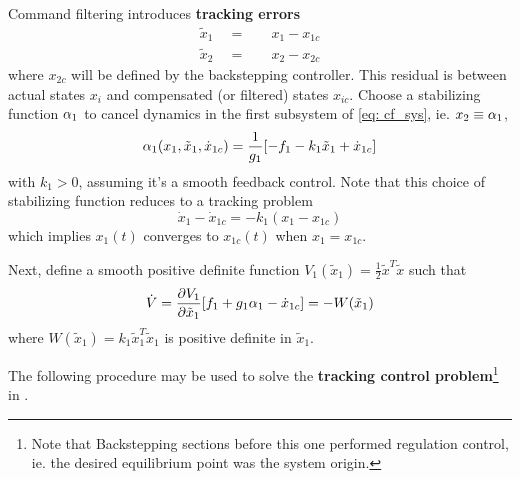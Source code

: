 \documentclass[12pt]{ucthesis}
\begin{document}
Command filtering introduces \textbf{tracking errors}
	\begin{subequations} \label{eq: cf_etrk}
		\begin{align} 
			\label{eq: cf_etrka} \tilde{x}_1 \quad=&\quad x_1 - x_{1c}\\
			\label{eq: cf_etrkb} \tilde{x}_2 \quad=&\quad x_2 - x_{2c}
		\end{align}
	\end{subequations}
%
where $x_{2c}$ will be defined by the backstepping controller. This residual is between actual states $x_i$ and compensated (or filtered) states $x_{ic}$. Choose a stabilizing function $\alpha_1$ to cancel dynamics in the first subsystem of \ref{eq: cf_sys}, ie. $x_2 \equiv \alpha_1$,
	\begin{equation} \label{eq: cf_stab}
		\alpha_1(x_1,\tilde{x}_1,\dot{x}_{1c}) = \frac{1}{g_1}[-f_1 -k_1\tilde{x}_1 +\dot{x}_{1c}]
	\end{equation}
with $k_1>0$, assuming it's a smooth feedback control. Note that this choice of stabilizing function reduces  to a tracking problem
	\begin{equation} \label{eq: cf_tracking}
		\dot{x}_1 - \dot{x}_{1c} = -k_1(x_1 - x_{1c})
	\end{equation}
which implies $x_1(t)$ converges to $x_{1c}(t)$ when $x_1 = x_{1c}$.

Next, define a smooth positive definite function $V_1(\tilde{x}_1) = \frac{1}{2}\tilde{x}^T\tilde{x}$ such that
	\begin{equation} \label{eq: cf_vdot}
		\dot{V} = \frac{\partial V_1}{\partial\tilde{x}_1}[f_1 + g_1\alpha_1 - \dot{x}_{1c}] = -W(\tilde{x}_1)
	\end{equation}
where $W(\tilde{x}_1)=k_1\tilde{x}_1^T\tilde{x}_1$ is positive definite in $\tilde{x}_1$.

The following procedure may be used to solve the \textbf{tracking control problem}\footnote{Note that Backstepping sections before this one performed regulation control, ie. the desired equilibrium point was the system origin.} in .
\end{document}
